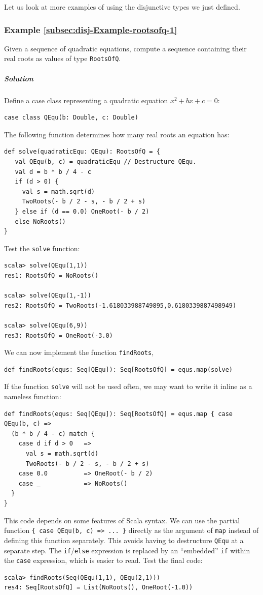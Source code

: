 Let us look at more examples of using the disjunctive types we just
defined.

\subsubsection{Example \label{subsec:disj-Example-rootsofq-1}\ref{subsec:disj-Example-rootsofq-1}}

Given a sequence of quadratic equations, compute a sequence containing
their real roots as values of type \lstinline!RootsOfQ!.

\subparagraph{Solution}

Define a case class representing a quadratic equation $x^{2}+bx+c=0$:
\begin{lstlisting}
case class QEqu(b: Double, c: Double)
\end{lstlisting}
The following function determines how many real roots an equation
has:
\begin{lstlisting}
def solve(quadraticEqu: QEqu): RootsOfQ = {
   val QEqu(b, c) = quadraticEqu // Destructure QEqu.
   val d = b * b / 4 - c
   if (d > 0) {
     val s = math.sqrt(d)
     TwoRoots(- b / 2 - s, - b / 2 + s)
   } else if (d == 0.0) OneRoot(- b / 2)
   else NoRoots()
}
\end{lstlisting}
Test the \lstinline!solve! function:
\begin{lstlisting}
scala> solve(QEqu(1,1))
res1: RootsOfQ = NoRoots()

scala> solve(QEqu(1,-1))
res2: RootsOfQ = TwoRoots(-1.618033988749895,0.6180339887498949) 

scala> solve(QEqu(6,9))
res3: RootsOfQ = OneRoot(-3.0) 
\end{lstlisting}
We can now implement the function \lstinline!findRoots!,
\begin{lstlisting}
def findRoots(equs: Seq[QEqu]): Seq[RootsOfQ] = equs.map(solve)
\end{lstlisting}
If the function \lstinline!solve! will not be used often, we may
want to write it inline as a nameless function:
\begin{lstlisting}
def findRoots(equs: Seq[QEqu]): Seq[RootsOfQ] = equs.map { case QEqu(b, c) =>
  (b * b / 4 - c) match {
    case d if d > 0   =>
      val s = math.sqrt(d)
      TwoRoots(- b / 2 - s, - b / 2 + s)
    case 0.0          => OneRoot(- b / 2)
    case _            => NoRoots()
  }
}
\end{lstlisting}
This code depends on some features of Scala syntax. We can use the
partial function \lstinline!{ case QEqu(b, c) => ... }! directly
as the argument of \lstinline!map! instead of defining this function
separately. This avoids having to destructure \lstinline!QEqu! at
a separate step. The \lstinline!if!/\lstinline!else! expression
is replaced by an ``embedded'' \lstinline!if!
within the \lstinline!case! expression, which is easier to read.
Test the final code:
\begin{lstlisting}
scala> findRoots(Seq(QEqu(1,1), QEqu(2,1)))
res4: Seq[RootsOfQ] = List(NoRoots(), OneRoot(-1.0)) 
\end{lstlisting}


